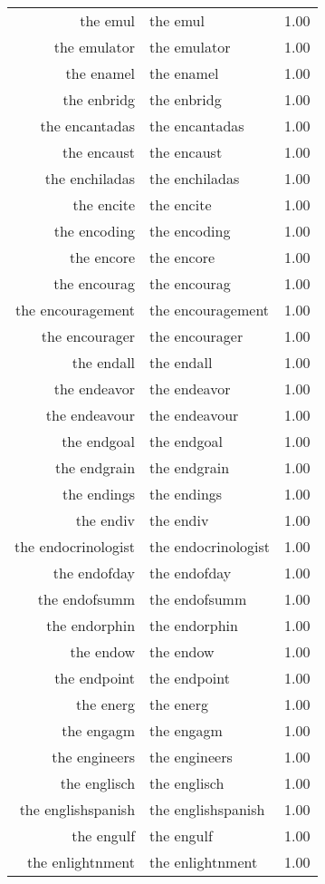 \begin{table}[ht]
\begin{tabular}{rlr}
  the emul & the emul & 1.00 \\ 
  the emulator & the emulator & 1.00 \\ 
  the enamel & the enamel & 1.00 \\ 
  the enbridg & the enbridg & 1.00 \\ 
  the encantadas & the encantadas & 1.00 \\ 
  the encaust & the encaust & 1.00 \\ 
  the enchiladas & the enchiladas & 1.00 \\ 
  the encite & the encite & 1.00 \\ 
  the encoding & the encoding & 1.00 \\ 
  the encore & the encore & 1.00 \\ 
  the encourag & the encourag & 1.00 \\ 
  the encouragement & the encouragement & 1.00 \\ 
  the encourager & the encourager & 1.00 \\ 
  the endall & the endall & 1.00 \\ 
  the endeavor & the endeavor & 1.00 \\ 
  the endeavour & the endeavour & 1.00 \\ 
  the endgoal & the endgoal & 1.00 \\ 
  the endgrain & the endgrain & 1.00 \\ 
  the endings & the endings & 1.00 \\ 
  the endiv & the endiv & 1.00 \\ 
  the endocrinologist & the endocrinologist & 1.00 \\ 
  the endofday & the endofday & 1.00 \\ 
  the endofsumm & the endofsumm & 1.00 \\ 
  the endorphin & the endorphin & 1.00 \\ 
  the endow & the endow & 1.00 \\ 
  the endpoint & the endpoint & 1.00 \\ 
  the energ & the energ & 1.00 \\ 
  the engagm & the engagm & 1.00 \\ 
  the engineers & the engineers & 1.00 \\ 
  the englisch & the englisch & 1.00 \\ 
  the englishspanish & the englishspanish & 1.00 \\ 
  the engulf & the engulf & 1.00 \\ 
  the enlightnment & the enlightnment & 1.00 \\ 

\end{tabular}
\end{table}
